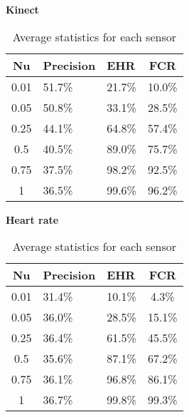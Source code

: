 \begin{table}[h]
  \textbf{Kinect}\vspace{2pt}
  \begin{tabularx}{\columnwidth}{cXXc}
    \toprule
    \textbf{Nu} & \textbf{Precision} & \textbf{EHR} & \textbf{FCR} \\
    \midrule
    0.01        & 51.7\%             & 21.7\%       & 10.0\%       \\ \hline
    0.05        & 50.8\%             & 33.1\%       & 28.5\%       \\ \hline
    0.25        & 44.1\%             & 64.8\%       & 57.4\%       \\ \hline
    0.5         & 40.5\%             & 89.0\%       & 75.7\%       \\ \hline
    0.75        & 37.5\%             & 98.2\%       & 92.5\%       \\ \hline
    1           & 36.5\%             & 99.6\%       & 96.2\%       \\ \hline
    \bottomrule
  \end{tabularx}

  \vspace{4pt}

  \textbf{Heart rate}\vspace{2pt}
  \begin{tabularx}{\columnwidth}{cXXc}
    \toprule
    \textbf{Nu} & \textbf{Precision} & \textbf{EHR} & \textbf{FCR} \\
    \midrule
    0.01        & 31.4\%             & 10.1\%       & 4.3\%        \\ \hline
    0.05        & 36.0\%             & 28.5\%       & 15.1\%       \\ \hline
    0.25        & 36.4\%             & 61.5\%       & 45.5\%       \\ \hline
    0.5         & 35.6\%             & 87.1\%       & 67.2\%       \\ \hline
    0.75        & 36.1\%             & 96.8\%       & 86.1\%       \\ \hline
    1           & 36.7\%             & 99.8\%       & 99.3\%       \\ \hline
    \bottomrule
  \end{tabularx}

  \caption{Average statistics for each sensor}
  \label{[TABLE] avg_stats_sensors}
\end{table}
